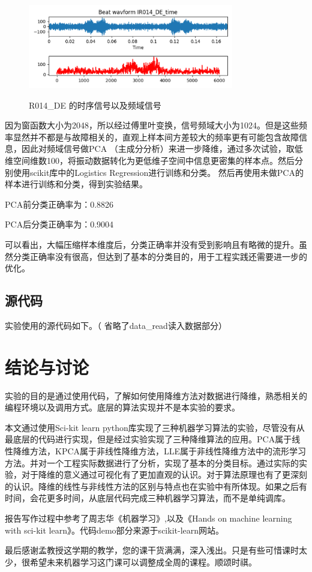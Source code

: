 \documentclass[UTF8]{ctexart}
\begin{document}
	\begin{figure}[H]
	  \centering
	  \label{fig:Per3A}\includegraphics[width=0.8\textwidth]{whitnoise.png}\
	  \caption{R014\_DE 的时序信号以及频域信号}
	  \label{fig:oscil}    
	\end{figure}
	
因为窗函数大小为2048，所以经过傅里叶变换，信号频域大小为1024。但是这些频率显然并不都是与故障相关的，直观上样本间方差较大的频率更有可能包含故障信息，因此对频域信号做PCA （主成分分析）来进一步降维，通过多次试验，取低维空间维数100，将振动数据转化为更低维子空间中信息更密集的样本点。然后分别使用sci\-kit库中的Logistics Regression进行训练和分类。 然后再使用未做PCA的样本进行训练和分类，得到实验结果。

PCA前分类正确率为：0.8826

PCA后分类正确率为：0.9004

可以看出，大幅压缩样本维度后，分类正确率并没有受到影响且有略微的提升。虽然分类正确率没有很高，但达到了基本的分类目的，用于工程实践还需要进一步的优化。


\subsection{源代码}
实验使用的源代码如下。（ 省略了data\_read读入数据部分） \vspace{5mm}
	
	\vspace{3mm}
	

\newpage
\section{结论与讨论}
实验的目的是通过使用代码，了解如何使用降维方法对数据进行降维，熟悉相关的编程环境以及调用方式。底层的算法实现并不是本实验的要求。

本文通过使用Sci-kit learn python库实现了三种机器学习算法的实验，尽管没有从最底层的代码进行实现，但是经过实验实现了三种降维算法的应用。PCA属于线性降维方法，KPCA属于非线性降维方法，LLE属于非线性降维方法中的流形学习方法。并对一个工程实际数据进行了分析，实现了基本的分类目标。通过实际的实验，对于降维的意义通过可视化有了更加直观的认识。对于算法原理也有了更深刻的认识。降维的线性与非线性方法的区别与特点也在实验中有所体现。如果之后有时间，会花更多时间，从底层代码完成三种机器学习算法，而不是单纯调库。

报告写作过程中参考了周志华《机器学习》,以及《Hands on machine learning with sci-kit learn》。代码demo部分来源于scikit-learn网站。

最后感谢孟教授这学期的教学，您的课干货满满，深入浅出。只是有些可惜课时太少，很希望未来机器学习这门课可以调整成全周的课程。顺颂时祺。
\end{document}
